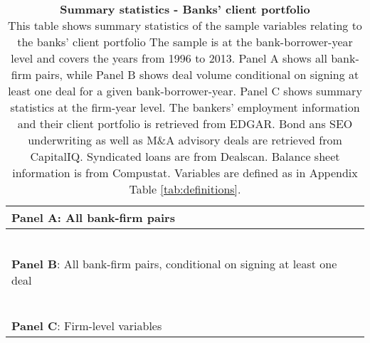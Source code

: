 \begin{table}[H] \begin{center} 
		\caption{\textbf{Summary statistics - Banks’ client portfolio} \\ This table shows summary statistics of the sample variables relating to the banks' client portfolio The sample is at the bank-borrower-year level and covers the years from 1996 to 2013. Panel A shows all bank-firm pairs, while Panel B shows deal volume conditional on signing at least one deal for a given bank-borrower-year. Panel C shows summary statistics at the firm-year level. The bankers' employment information and their client portfolio is retrieved from EDGAR. Bond ans SEO underwriting as well as M\&A advisory deals are retrieved from CapitalIQ. Syndicated loans are from Dealscan. Balance sheet information is from Compustat. Variables are defined as in Appendix Table \ref{tab:definitions}. }
		\label{tab:sumstat_bank} 
	\begin{threeparttable}  
		\begin{tabular*}{\hsize} {@{\hskip\tabcolsep\extracolsep\fill}l*{7}{c}}
		 \multicolumn{7}{l}{\textbf{Panel A}: All bank-firm pairs} \\ \toprule 
		  
		 \bottomrule \\ ~ \\ 
	
	 	 \multicolumn{7}{l}{\textbf{Panel B}: All bank-firm pairs, conditional on signing at least one deal} \\
			\toprule 
			 
				\bottomrule \\ ~ \\

		\multicolumn{7}{l}{\textbf{Panel C}: Firm-level variables} \\
	\toprule 
 		  
 		 	\bottomrule 
	\end{tabular*} 	\end{threeparttable}  \end{center} \end{table}

\clearpage \newpage

